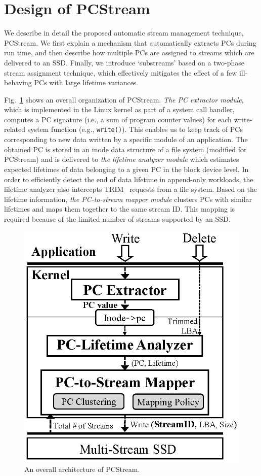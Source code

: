 \section{Design of PCStream}
We describe in detail the proposed automatic stream management technique, {\sf
PCStream}.  We first explain a mechanism that automatically extracts PCs during
run time, and then describe how multiple PCs are assigned to streams which are
delivered to an SSD.  Finally, we introduce `substreams' based on a two-phase
stream assignment technique, which effectively mitigates the effect of a few
ill-behaving PCs with large lifetime variances.


Fig.~\ref{fig:architecture} shows an overall organization of {\sf PCStream}.
\textit{The PC extractor module}, which is implemented in the Linux kernel as
part of a system call handler, computes a PC signature (i.e., a sum of program
counter values) for each write-related system function (e.g.,
\texttt{write()}).  This enables us to keep track of PCs corresponding to new
data written by a specific module of an application.  The obtained PC is stored
in an inode data structure of a file system (modified for \textsf{PCStream})
and is delivered to \textit{the lifetime analyzer module} which estimates
expected lifetimes of data belonging to a given PC in the block device level.
In order to efficiently detect the end of data lifetime in append-only
workloads, the lifetime analyzer also intercepts TRIM~\cite{TRIM} requests from
a file system.  Based on the lifetime information, \textit{the PC-to-stream
mapper module} clusters PCs with similar lifetimes and maps them together to
the same stream ID.  This mapping is required because of the limited number of
streams supported by an SSD.

\begin{figure}[t]
	\centering
	\includegraphics[width=0.6\linewidth]{figure/architecture4}
	\vspace{-10pt}
	\caption{An overall architecture of {\sf PCStream}.}
	\label{fig:architecture}
	\vspace{-15pt}
\end{figure}

